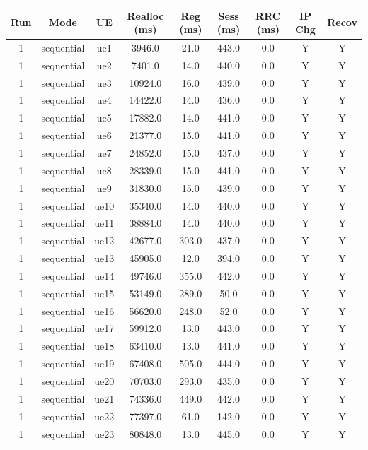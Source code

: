 \begin{table}[ht]
\centering
\begin{tabular}{|c|c|c|c|c|c|c|c|c|}
\hline
Run & Mode & UE & Realloc (ms) & Reg (ms) & Sess (ms) & RRC (ms) & IP Chg & Recov \\
\hline
1 & sequential & ue1 & 3946.0 & 21.0 & 443.0 & 0.0 & Y & Y \\
1 & sequential & ue2 & 7401.0 & 14.0 & 440.0 & 0.0 & Y & Y \\
1 & sequential & ue3 & 10924.0 & 16.0 & 439.0 & 0.0 & Y & Y \\
1 & sequential & ue4 & 14422.0 & 14.0 & 436.0 & 0.0 & Y & Y \\
1 & sequential & ue5 & 17882.0 & 14.0 & 441.0 & 0.0 & Y & Y \\
1 & sequential & ue6 & 21377.0 & 15.0 & 441.0 & 0.0 & Y & Y \\
1 & sequential & ue7 & 24852.0 & 15.0 & 437.0 & 0.0 & Y & Y \\
1 & sequential & ue8 & 28339.0 & 15.0 & 441.0 & 0.0 & Y & Y \\
1 & sequential & ue9 & 31830.0 & 15.0 & 439.0 & 0.0 & Y & Y \\
1 & sequential & ue10 & 35340.0 & 14.0 & 440.0 & 0.0 & Y & Y \\
1 & sequential & ue11 & 38884.0 & 14.0 & 440.0 & 0.0 & Y & Y \\
1 & sequential & ue12 & 42677.0 & 303.0 & 437.0 & 0.0 & Y & Y \\
1 & sequential & ue13 & 45905.0 & 12.0 & 394.0 & 0.0 & Y & Y \\
1 & sequential & ue14 & 49746.0 & 355.0 & 442.0 & 0.0 & Y & Y \\
1 & sequential & ue15 & 53149.0 & 289.0 & 50.0 & 0.0 & Y & Y \\
1 & sequential & ue16 & 56620.0 & 248.0 & 52.0 & 0.0 & Y & Y \\
1 & sequential & ue17 & 59912.0 & 13.0 & 443.0 & 0.0 & Y & Y \\
1 & sequential & ue18 & 63410.0 & 13.0 & 441.0 & 0.0 & Y & Y \\
1 & sequential & ue19 & 67408.0 & 505.0 & 444.0 & 0.0 & Y & Y \\
1 & sequential & ue20 & 70703.0 & 293.0 & 435.0 & 0.0 & Y & Y \\
1 & sequential & ue21 & 74336.0 & 449.0 & 442.0 & 0.0 & Y & Y \\
1 & sequential & ue22 & 77397.0 & 61.0 & 142.0 & 0.0 & Y & Y \\
1 & sequential & ue23 & 80848.0 & 13.0 & 445.0 & 0.0 & Y & Y \\

\end{tabular}
\end{table}
